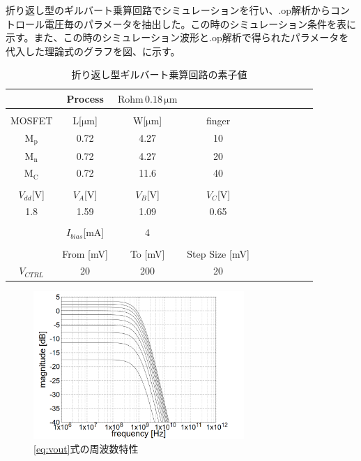\documentclass[twocolumn]{jsarticle}
\begin{document}
    折り返し型のギルバート乗算回路でシミュレーションを行い、.op解析からコントロール電圧毎のパラメータを抽出した。この時のシミュレーション条件を表に示す。また、この時のシミュレーション波形と.op解析で得られたパラメータを代入した理論式のグラフを図、に示す。
    \begin{table}[h]
        \caption{折り返し型ギルバート乗算回路の素子値}
        \label{table:state_folded_ac}
        \centering
        \begin{tabular}{cccccccccc}
            \hline
            &Process&$\mathrm{Rohm\,0.18\,\mu m}$&\\
            \hline
            &&&\\
            MOSFET & L[$\mathrm{\mu m}$] & W[$\mathrm{\mu m}$] & finger\\
            \hline \hline
            $\mathrm{M_{p}}$ & 0.72 & 4.27 & 10 \\
            $\mathrm{M_{n}}$ & 0.72 & 4.27 & 20 \\
            $\mathrm{M_{C}}$ & 0.72 & 11.6 & 40 \\
            &&&\\
            $V_{dd}$[V] & $V_{A}$[V] & $V_{B}$[V] & $V_{C}$[V]\\
            \hline\hline
            1.8 & 1.59 & 1.09 & 0.65 \\
            &&&\\
            \hline\hline
            & $I_{bias}$[mA] & 4 & \\
            \hline\hline
            &&&\\
            & From [mV] & To [mV] &  Step Size [mV]   \\
            \hline\hline
            $V_{CTRL}$ & 20 & 200 & 20

        \end{tabular}
    \end{table}
    \begin{figure}[H]
        \begin{center}
            \includegraphics*[width = 80mm]{figures/vout_ac_theoretical_monochrome.PNG}
            \caption{\eqref{eq:vout}式の周波数特性}
            \label{fig:vout_theoretical}
        \end{center}
    \end{figure}
\end{document}
